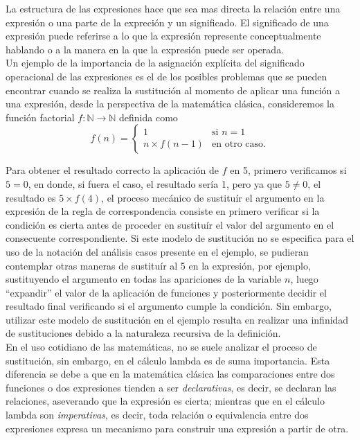 La estructura de las expresiones hace que sea mas directa la relación entre una
expresión o una parte de la expreción y un significado. El significado de una
expresión puede referirse a lo que la expresión represente conceptualmente
hablando o a la manera en la que la expresión puede ser operada.\\

Un ejemplo de la importancia de la asignación explícita del significado
operacional de las expresiones es el de los posibles problemas que se pueden
encontrar cuando se realiza la sustitución al momento de aplicar una función a
una expresión, desde la perspectiva de la matemática clásica, consideremos la
función factorial \(f : \mathbb{N} \to \mathbb{N}\) definida como
\[f(n)=
\begin{cases} 
  1 &\mbox{si } n=1\\
  n\times f(n-1) & \mbox{en otro caso.}
\end{cases}
\]

Para obtener el resultado correcto la aplicación de \(f\) en 5, primero
verificamos si \(5=0\), en donde, si fuera el caso, el resultado sería 1, pero
ya que \(5\not= 0\), el resultado es \(5\times f(4)\), el proceso mecánico de
sustituír el argumento en la expresión de la regla de correspondencia consiste
en primero verificar si la condición es cierta antes de proceder en sustituír el
valor del argumento en el consecuente correspondiente. Si este modelo de
sustitución no se especifica para el uso de la notación del análisis casos
presente en el ejemplo, se pudieran contemplar otras maneras de sustituír al 5
en la expresión, por ejemplo, sustituyendo el argumento en todas las apariciones
de la variable \(n\), luego ``expandir'' el valor de la aplicación de funciones
y posteriormente decidir el resultado final verificando si el argumento cumple
la condición. Sin embargo, utilizar este modelo de sustitución en el ejemplo
resulta en realizar una infinidad de sustituciones debido a la naturaleza
recursiva de la definición.\\

En el uso cotidiano de las matemáticas, no se suele analizar el proceso de
sustitución, sin embargo, en el cálculo lambda es de suma importancia. Esta
diferencia se debe a que en la matemática clásica las comparaciones entre dos
funciones o dos expresiones tienden a ser \emph{declarativas}, es decir, se
declaran las relaciones, aseverando que la expresión es cierta; mientras que en
el cálculo lambda son \emph{imperativas}, es decir, toda relación o equivalencia
entre dos expresiones expresa un mecanismo para construir una expresión a partir
de otra.\\

